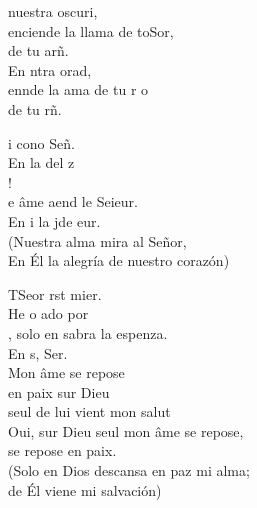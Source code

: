 \documentclass[12pt]{article}
\begin{document}
\begin{multicols*}{2}
\begin{cancion}%
	 nuestra oscuri,\\
	enciende la llama de toSor,\\
	de tu arñ. \\
	En ntra orad,\\
	ennde la ama de tu r o \\
	de tu rñ. \\
\end{cancion}%

\begin{cancion}%
	i cono Señ.  \\
	En  la del z\\
	!   \\
\jump
	e âme aend le Seieur.\\
	En i la jde eur.\\
(Nuestra alma mira al Señor,\\
En Él la alegría de nuestro corazón)\\
\end{cancion}%

\begin{cancion}%
	TSeor rst mier.\\
	He o ado por \\
	, solo en sabra la espenza. \\
	En s, Ser.\\
Mon âme se repose\\
en paix sur Dieu \\
seul de lui vient mon salut\\
Oui, sur Dieu seul mon âme se repose,\\
se repose en paix.\\
(Solo en Dios descansa en paz mi alma;\\
de Él viene mi salvación)\\
\end{cancion}%


\end{multicols*}
\end{document}
